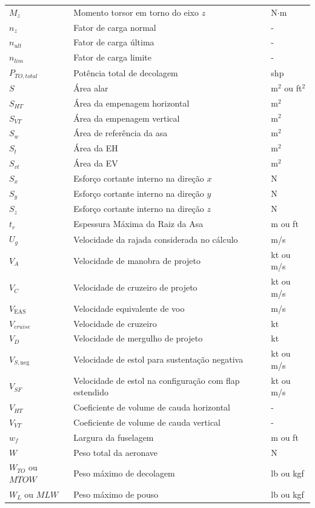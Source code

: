 \begin{longtable}{p{} p{} p{}}
$M_z$ & Momento torsor em torno do eixo $z$ & N$\cdot$m \\
$n_z$ & Fator de carga normal & - \\
$n_{ult}$ & Fator de carga última & - \\
$n_{lim}$ & Fator de carga limite & - \\
$P_{TO,total}$ & Potência total de decolagem & shp \\
$S$ & Área alar & m$^2$ ou ft$^2$ \\
$S_{HT}$ & Área da empenagem horizontal & m$^2$ \\
$S_{VT}$ & Área da empenagem vertical & m$^2$ \\
$S_w$ & Área de referência da asa & m$^2$ \\
$S_t$ & Área da EH & m$^2$ \\
$S_{vt}$ & Área da EV & m$^2$ \\
$S_x$ & Esforço cortante interno na direção $x$ & N \\
$S_y$ & Esforço cortante interno na direção $y$ & N \\
$S_z$ & Esforço cortante interno na direção $z$ & N \\
$t_r$ & Espessura Máxima da Raiz da Asa & m ou ft\\
$U_g$ & Velocidade da rajada considerada no cálculo & m/s \\
$V_A$ & Velocidade de manobra de projeto & kt ou m/s \\
$V_C$ & Velocidade de cruzeiro de projeto & kt ou m/s \\
$V_{\mathrm{EAS}}$ & Velocidade equivalente de voo & m/s \\
$V_{cruise}$ & Velocidade de cruzeiro & kt \\
$V_D$ & Velocidade de mergulho de projeto & kt \\
$V_{S,\mathrm{neg}}$ & Velocidade de estol para sustentação negativa & kt ou m/s \\
$V_{SF}$ & Velocidade de estol na configuração com flap estendido & kt ou m/s \\
$V_{HT}$ & Coeficiente de volume de cauda horizontal & - \\
$V_{VT}$ & Coeficiente de volume de cauda vertical & - \\
$w_f$ & Largura da fuselagem & m ou ft \\
$W$ & Peso total da aeronave & N \\
$W_{TO}$ ou $MTOW$ & Peso máximo de decolagem & lb ou kgf \\
$W_L$ ou $MLW$ & Peso máximo de pouso & lb ou kgf \\

\end{longtable}
